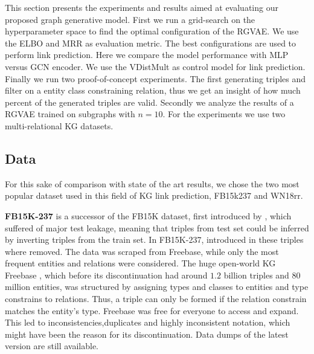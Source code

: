 
This section presents the experiments and results aimed at evaluating our proposed graph generative model. First we run a grid-search on the hyperparameter space to find the optimal configuration of the RGVAE. We use the ELBO and MRR as evaluation metric. The best configurations are used to perform link prediction. Here we compare the model performance with MLP versus GCN encoder. We use the VDistMult as control model for link prediction. Finally we run two proof-of-concept experiments. The first generating triples and filter on a entity class constraining relation, thus we get an insight of how much percent of the generated triples are valid. Secondly we analyze the results of a RGVAE trained on subgraphs with $n=10$. For the experiments we use two multi-relational KG datasets.



\subsection{Data}
\label{ssec5:data}
For this sake of comparison with state of the art results, we chose the two most popular dataset used in this field of KG link prediction, FB15k237 and WN18rr.


\textbf{FB15K-237} is a successor of the FB15K dataset, first introduced by \cite{bordes_translating_2013}, which suffered of major test leakage, meaning that triples from test set could be inferred by inverting triples from the train set. In FB15K-237, introduced in \cite{toutanova_representing_2015} these triples where removed.
The data was scraped from Freebase, while only the most frequent entities and relations were considered. The huge open-world KG Freebase \cite{bollacker_freebase_2008}, which before its discontinuation had around $1.2$ billion triples and $80$ million entities, was structured by assigning types and classes to entities and type constrains to relations. Thus, a triple can only be formed if the relation constrain matches the entity's type. Freebase was free for everyone to access and expand. This led to inconsistencies,duplicates and highly inconsistent notation, which might have been the reason for its discontinuation. Data dumps of the latest version are still available.




